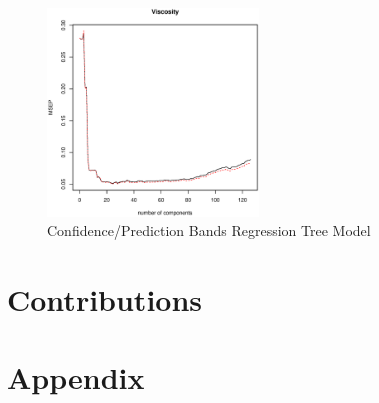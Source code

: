 \documentclass[a4paper, twocolumn]{article}
\begin{document}
        \begin{figure}[h!]
            \centering
            \caption{Confidence/Prediction Bands Regression Tree Model}
            \label{fig:icascores}
            \includegraphics[width=0.5\textwidth]{share/A2_viscosity.eps}
        \end{figure}

    \section*{Contributions}

    \nocite{*} %
    
    
    \onecolumn \appendix
    \section*{Appendix}

    
    
\end{document}
